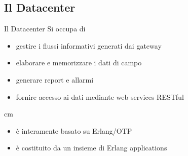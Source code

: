\documentclass{beamer}
\newcommand{\N}{\vskip 0.3 cm}
\newcommand{\red}[1]{\textcolor[rgb]{.8,0,0}{#1}}
\newcommand{\green}[1]{\textcolor[rgb]{0,.6,.1}{#1}}
\begin{document}
%

%
\subsection{Il Datacenter}
%
\begin{frame}{Il Datacenter}
Si occupa di
\begin{itemize}
\item \green{gestire i flussi informativi} generati dai gateway
\item \green{elaborare} e \green{memorizzare} i dati di campo 
\item generare \green{report} e \green{allarmi}
\item fornire \green{accesso ai dati} mediante \green{web services RESTful}
\end{itemize}
%
\N
\begin{itemize}
  \item \`e interamente basato su \red{Erlang/OTP}
  \item \`e costituito da un insieme di \red{Erlang applications}
\end{itemize}
%
\begin{figure}[!h]
  \begin{center}
  \end{center}
\end{figure}
%
\end{frame}
%
\end{document}
